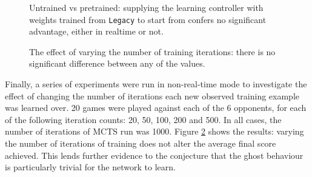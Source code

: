 \begin{figure}
\centering
{}
\caption[Untrained vs pretrained]{Untrained vs pretrained: supplying the learning controller with weights trained from {\tt Legacy} to start from confers no significant advantage, either in realtime or not.}
\label{fig:resultsuntrained}
\end{figure}

\begin{figure}
\centering
{}
\caption[The effect of varying the number of training iterations]{The effect of varying the number of training iterations: there is no significant difference between any of the values.}
\label{fig:resultsiterations}
\end{figure}



Finally, a series of experiments were run in non-real-time mode to investigate the effect of changing the number of iterations each new observed training example was learned over.  20 games were played against each of the 6 opponents, for each of the following iteration counts: 20, 50, 100, 200 and 500.  In all cases, the number of iterations of MCTS run was 1000.  Figure \ref{fig:resultsiterations} shows the results: varying the number of iterations of training does not alter the average final score achieved.  This lends further evidence to the conjecture that the ghost behaviour is particularly trivial for the network to learn.

